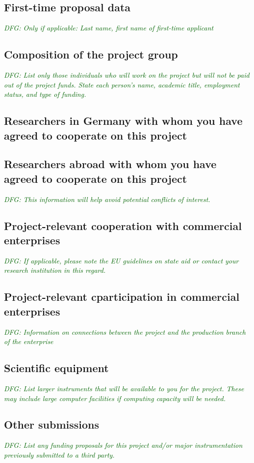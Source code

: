 \documentclass[a4paper,11pt]{amsart}
\theoremstyle{definition}
\newcommand{\<}{\langle}
\renewcommand{\>}{\rangle}
\newcommand{\dfg}[1]{\emph{\textcolor{darkgreen}{DFG: #1}}}
\begin{document}
\subsection{First-time proposal data}
\dfg{Only if applicable: Last name, first name of first-time
  applicant}

\subsection{Composition of the project group}
\dfg{List only those individuals who will work on the project but will
  not be paid out of the project funds. State each person’s name,
  academic title, employment status, and type of funding.}

\subsection{Researchers in Germany with whom you have agreed to cooperate on this project}

\subsection{Researchers abroad with whom you have agreed to cooperate on this project}
\dfg{This information will help avoid potential conflicts of
  interest.}

\subsection{Project-relevant cooperation with commercial enterprises}
\dfg{If applicable, please note the EU guidelines on state aid or
  contact your research institution in this regard.}

\subsection{Project-relevant cparticipation in commercial enterprises}
\dfg{Information on connections between the project and the production
  branch of the enterprise}

\subsection{Scientific equipment}
\dfg{List larger instruments that will be available to you for the
  project. These may include large computer facilities if computing
  capacity will be needed.}

\subsection{Other submissions}
\dfg{List any funding proposals for this project and/or major
  instrumentation previously submitted to a third party.}
\end{document}
